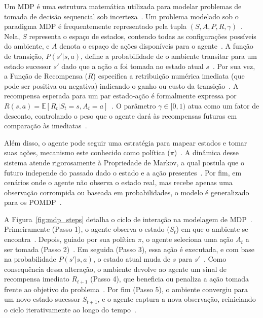 Um \gls{MDP} é uma estrutura matemática utilizada para modelar problemas de tomada de decisão sequencial sob incerteza~\cite{sutton2018, zhao2024}. Um problema modelado sob o paradigma \gls{MDP} é frequentemente representado pela tupla $(S, A, P, R, \gamma)$~\cite{sutton2018, hu2024}. Nela, $S$ representa o espaço de estados, contendo todas as configurações possíveis do ambiente, e $A$ denota o espaço de ações disponíveis para o agente~\cite{hu2024}. A função de transição, $P(s' | s, a)$, define a probabilidade de o ambiente transitar para um estado sucessor $s'$ dado que a ação $a$ foi tomada no estado atual $s$~\cite{sutton2018, zhao2024}. Por sua vez, a Função de Recompensa ($R$) especifica a retribuição numérica imediata (que pode ser positiva ou negativa) indicando o ganho ou custo da transição~\cite{sutton2018, hu2024}. A recompensa esperada para um par estado-ação é formalmente expressa por $R(s,a) = \mathbb{E}[R_t | S_t = s, A_t = a]$~\cite{hu2024}. O parâmetro $\gamma \in [0,1)$ atua como um fator de desconto, controlando o peso que o agente dará às recompensas futuras em comparação às imediatas~\cite{sutton2018, zhao2024}. 

Além disso, o agente pode seguir uma estratégia para mapear estados e tomar suas ações, mecanismo este conhecido como política ($\pi$)~\cite{hu2024}. A dinâmica desse sistema atende rigorosamente à Propriedade de Markov, a qual postula que o futuro independe do passado dado o estado e a ação presentes~\cite{sutton2018, zhao2024}. Por fim, em cenários onde o agente não observa o estado real, mas recebe apenas uma observação corrompida ou baseada em probabilidades, o modelo é generalizado para os \gls{POMDP}~\cite{sutton2018, hu2024}.

A Figura~\ref{fig:mdp_steps} detalha o ciclo de interação na modelagem de \gls{MDP}~\cite{sutton2018}. Primeiramente (Passo 1), o agente observa o estado ($S_t$) em que o ambiente se encontra~\cite{sutton2018}. Depois, guiado por sua política $\pi$, o agente seleciona uma ação $A_t$ a ser tomada (Passo 2)~\cite{sutton2018}. Em seguida (Passo 3), essa ação é executada, e com base na probabilidade $P(s'|s,a)$, o estado atual muda de $s$ para $s'$~\cite{sutton2018}. Como consequência dessa alteração, o ambiente devolve ao agente um sinal de recompensa imediato $R_{t+1}$ (Passo 4), que beneficia ou penaliza a ação tomada frente ao objetivo do problema~\cite{sutton2018}. Por fim (Passo 5), o ambiente convergiu para um novo estado sucessor $S_{t+1}$, e o agente captura a nova observação, reiniciando o ciclo iterativamente ao longo do tempo~\cite{sutton2018}.

